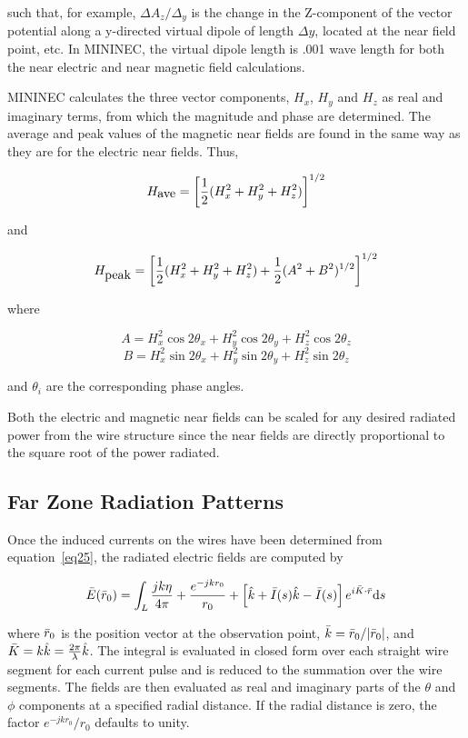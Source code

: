 \documentclass[12pt]{article}
\begin{document}
such that, for example, $\Delta A_z/\Delta_y$ is the change in the
Z-component of the vector potential along a y-directed virtual dipole of
length $\Delta y$, located at the near field point, etc. In MININEC, the
virtual dipole length is .001 wave length for both the near electric and
near magnetic field calculations.

MININEC calculates the three vector components, $H_x$, $H_y$ and $H_z$
as real and imaginary terms, from which the magnitude and phase are
determined. The average and peak values of the magnetic near fields are
found in the same way as they are for the electric near fields. Thus,

\begin{equation}
H_{\mbox{ave}} = \left[\frac{1}{2}(H_x^2 + H_y^2 + H_z^2)\right]^{1/2}
\label{eq39}
\end{equation}

\noindent and

\begin{equation}
H_{\mbox{peak}} = \left[\frac{1}{2}(H_x^2 + H_y^2 + H_z^2)
                +\frac{1}{2}(A^2 + B^2)^{1/2} \right]^{1/2}
\label{eq40}
\end{equation}

\noindent where

\[ A = H_x^2\cos 2\theta_x + H_y^2\cos2\theta_y + H_z^2\cos2\theta_z
\]
\[ B = H_x^2\sin 2\theta_x + H_y^2\sin2\theta_y + H_z^2\sin2\theta_z
\]

\noindent and $\theta_i$ are the corresponding phase angles.

Both the electric and magnetic near fields can be scaled for any desired
radiated power from the wire structure since the near fields are
directly proportional to the square root of the power radiated.

\subsection{Far Zone Radiation Patterns}
Once the induced currents on the wires have been determined from
equation~\eqref{eq25}, the radiated electric fields are computed by

\begin{equation}
\bar{E}(\bar{r}_0) = \int_L\frac{jk\eta}{4\pi} + \frac{e^{-jkr_0}}{r_0}
+\left[\hat{k} + \bar{I}(s)\hat{k}-\bar{I}(s)\right]
e^{i\bar{K}\cdot\bar{r}}\mathrm{d}s
\label{eq41}
\end{equation}

\noindent where $\bar{r}_0$ is the position vector at the observation point,
$\bar{k} = \bar{r}_0 / |\bar{r}_0|$, and
$\bar{K} = k\hat{k} = \frac{2\pi}{\lambda}\hat{k}$. The integral is
evaluated in closed form over each straight wire segment for each
current pulse and is reduced to the summation over the wire segments.
The fields are then evaluated as real and imaginary parts of the
$\theta$ and $\phi$ components at a specified radial distance. If the
radial distance is zero, the factor $e^{-jkr_0}/r_0$ defaults to unity.
\end{document}
